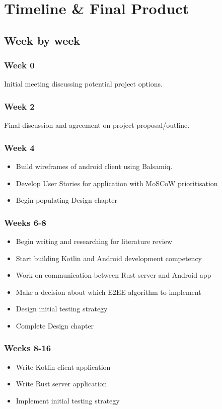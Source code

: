\documentclass{mproj}
\begin{document}
\chapter{Timeline \& Final Product}
\section{Week by week}
\subsection{Week 0}
Initial meeting discussing potential project options.
\subsection{Week 2}
Final discussion and agreement on project proposal/outline.
\subsection{Week 4}
\begin{itemize}
    \item Build wireframes of android client using Balsamiq.
    \item Develop User Stories for application with MoSCoW prioritisation
    \item Begin populating Design chapter
\end{itemize}

\subsection{Weeks 6-8}
\begin{itemize}
    \item Begin writing and researching for literature review
    \item Start building Kotlin and Android development competency
    \item Work on communication between Rust server and Android app
    \item Make a decision about which E2EE algorithm to implement
    \item Design initial testing strategy
    \item Complete Design chapter
\end{itemize}
\subsection{Weeks 8-16}
\begin{itemize}
    \item Write Kotlin client application
    \item Write Rust server application
    \item Implement initial testing strategy
\end{itemize}
\end{document}
